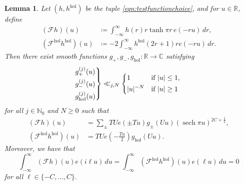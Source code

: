 \documentclass[11pt,a4paper]{amsart}
\newcommand{\C}{\mathbb{C}}
\newcommand{\Fscr}{\mathscr{F}}
\newcommand{\hol}{\mathrm{hol}}
\newcommand{\N}{\mathbb{N}}
\newcommand{\R}{\mathbb{R}}
\DeclareMathOperator{\sech}{sech}
\numberwithin{equation}{section}
\newtheorem{lemma}[equation]{Lemma}
\theoremstyle{remark}
\theoremstyle{definition}
\begin{document}
\begin{lemma}
Let $(h,h^{\hol})$ be the tuple \eqref{eqn:testfunctionchoice}, and for $u \in \R$, define
\begin{align}
\label{eqn:Fscrhdefeq}
(\Fscr h)(u) & \coloneqq \int_{-\infty}^{\infty} h(r) r \tanh \pi r \, e(-ru) \, dr,	\\
\label{eqn:Fscrholhholdefeq}
(\Fscr^{\hol} h^{\hol})(u) & \coloneqq -2 \int_{-\infty}^{\infty} h^{\hol}(2r + 1) r e(-ru) \, dr.
\end{align}
Then there exist smooth functions $g_{+},g_{-},g_{\hol} : \R \to \C$ satisfying
\begin{equation}
\label{eqn:gdecay}
\begin{drcases*}
g_{+}^{(j)}(u) \\
g_{-}^{(j)}(u) \\
g_{\hol}^{(j)}(u)
\end{drcases*} \ll_{j,N} \begin{dcases*}
1 & if $|u| \leq 1$,	\\
|u|^{-N} & if $|u| \geq 1$
\end{dcases*}
\end{equation}
for all $j \in \N_0$ and $N \geq 0$ such that
\begin{align}
\label{eqn:Fscrhdefeq2}
(\Fscr h)(u) & = \sum_{\pm} TU e(\pm Tu) g_{\pm}(Uu) (\sech \pi u)^{2C + \frac{1}{2}},	\\
\label{eqn:Fscrholhholdefeq2}
(\Fscr^{\hol} h^{\hol})(u) & = TU e\left(-\frac{Tu}{2}\right) g_{\hol}(Uu).
\end{align}
Moreover, we have that
\begin{equation}
\label{eqn:FscrFourierinversion}
\int_{-\infty}^{\infty} (\Fscr h)(u) e(i\ell u) \, du = \int_{-\infty}^{\infty} (\Fscr^{\hol} h^{\hol})(u) e(\ell u) \, du = 0
\end{equation}
for all $\ell \in \{-C,\ldots,C\}$.
\end{lemma}
\end{document}
